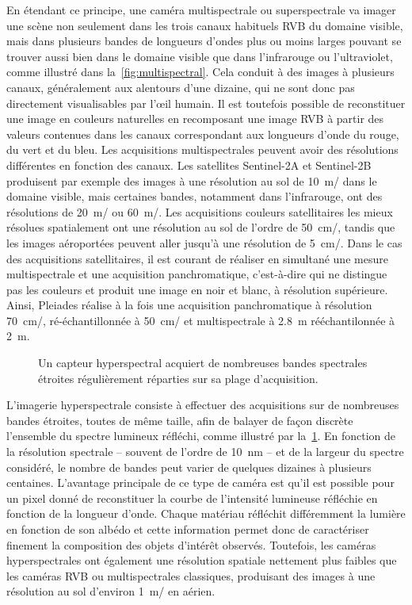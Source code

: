 En étendant ce principe, une caméra multispectrale ou superspectrale va imager une scène non seulement dans les trois canaux habituels \gls{RVB} du domaine visible, mais dans plusieurs bandes de longueurs d'ondes plus ou moins larges pouvant se trouver aussi bien dans le domaine visible que dans l'infrarouge ou l'ultraviolet, comme illustré dans la~\cref{fig:multispectral}. Cela conduit à des images à plusieurs canaux, généralement aux alentours d'une dizaine, qui ne sont donc pas directement visualisables par l'\oe{}il humain. Il est toutefois possible de reconstituer une image en couleurs naturelles en recomposant une image \gls{RVB} à partir des valeurs contenues dans les canaux correspondant aux longueurs d'onde du rouge, du vert et du bleu. Les acquisitions multispectrales peuvent avoir des résolutions différentes en fonction des canaux. Les satellites Sentinel-2A et Sentinel-2B produisent par exemple des images à une résolution au sol de \SI{10}{\meter/\px} dans le domaine visible, mais certaines bandes, notamment dans l'infrarouge, ont des résolutions de \SI{20}{\meter/\px} ou \SI{60}{\meter/\px}. Les acquisitions couleurs satellitaires les mieux résolues spatialement ont une résolution au sol de l'ordre de \SI{50}{\centi\meter/\px}, tandis que les images aéroportées peuvent aller jusqu'à une résolution de \SI{5}{\centi\meter/\px}. Dans le cas des acquisitions satellitaires, il est courant de réaliser en simultané une mesure multispectrale et une acquisition panchromatique, c'est-à-dire qui ne distingue pas les couleurs et produit une image en noir et blanc, à résolution supérieure. Ainsi, \gls{Pleiades} réalise à la fois une acquisition panchromatique à résolution \SI{70}{\centi\meter/\px}, ré-échantillonnée à \SI{50}{\centi\meter/\px} et multispectrale à \SI{2,8}{\meter} rééchantilonnée à \SI{2}{\meter}.

\begin{figure}
  \resizebox{\textwidth}{!}{
  
  }
  \caption{Un capteur hyperspectral acquiert de nombreuses bandes spectrales étroites régulièrement réparties sur sa plage d'acquisition.}
  \label{fig:hyperspectral}
\end{figure}

L'imagerie hyperspectrale consiste à effectuer des acquisitions sur de nombreuses bandes étroites, toutes de même taille, afin de balayer de façon discrète l'ensemble du spectre lumineux réfléchi, comme illustré par la~\cref{fig:hyperspectral}. En fonction de la résolution spectrale -- souvent de l'ordre de \SI{10}{\nano\meter} -- et de la largeur du spectre considéré, le nombre de bandes peut varier de quelques dizaines à plusieurs centaines. L'avantage principale de ce type de caméra est qu'il est possible pour un pixel donné de reconstituer la courbe de l'intensité lumineuse réfléchie en fonction de la longueur d'onde. Chaque matériau réfléchit différemment la lumière en fonction de son albédo et cette information permet donc de caractériser finement la composition des objets d'intérêt observés. Toutefois, les caméras hyperspectrales ont également une résolution spatiale nettement plus faibles que les caméras \gls{RVB} ou multispectrales classiques, produisant des images à une résolution au sol d'environ \SI{1}{\meter/\px} en aérien.

